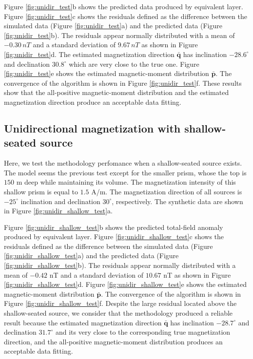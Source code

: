 Figure \ref{fig:unidir_test}b shows the predicted data produced by equivalent layer. 
Figure \ref{fig:unidir_test}c shows the residuals defined as the difference between the simulated data (Figure \ref{fig:unidir_test}a) and the predicted data (Figure \ref{fig:unidir_test}b). The residuals appear normally distributed with a mean of $-0.30 \, nT$ and a standard deviation of $9.67 \, nT$ as shown in Figure \ref{fig:unidir_test}d. The estimated magnetization direction $\bar{\mathbf{q}}$ has inclination $-28.6^\circ$ and declination $30.8^\circ$ which are very close to the true one. Figure \ref{fig:unidir_test}e shows the estimated magnetic-moment distribution $\bar{\mathbf{p}}$. The convergence of the algorithm is shown in Figure \ref{fig:unidir_test}f. These results show that the all-positive magnetic-moment distribution and the estimated magnetization direction produce an acceptable data fitting.

\subsection{Unidirectional magnetization with shallow-seated source}

Here, we test the methodology perfomance when a shallow-seated source exists. The model seems the previous test except for the smaller prism, whose the top is $150$ m deep while maintaining its volume. The magnetization intensity of this shallow prism is equal to $1.5$ A/m. The magnetization direction of all sources is $-25^\circ$ inclination and declination $30^\circ$, respectively. The synthetic data are shown in Figure \ref{fig:unidir_shallow_test}a.

Figure \ref{fig:unidir_shallow_test}b shows the predicted total-field anomaly produced by equivalent layer. Figure \ref{fig:unidir_shallow_test}c shows the residuals defined as the difference between the simulated data (Figure \ref{fig:unidir_shallow_test}a) and the predicted data (Figure \ref{fig:unidir_shallow_test}b). The residuals appear normally distributed with a mean of $-0.42$ nT and a standard deviation of $10.67$ nT as shown in Figure \ref{fig:unidir_shallow_test}d. Figure \ref{fig:unidir_shallow_test}e shows the estimated magnetic-moment distribution $\bar{\mathbf{p}}$. The convergence of the algorithm is shown in Figure \ref{fig:unidir_shallow_test}f. Despite the large residual located above the shallow-seated source, we consider that the methodology produced a reliable result because the estimated magnetization direction $\bar{\mathbf{q}}$ has inclination $-28.7^\circ$ and declination $31.7^\circ$ and its very close to the corresponding true magnetization direction, and the all-positive magnetic-moment distribution produces an acceptable data fitting. 

